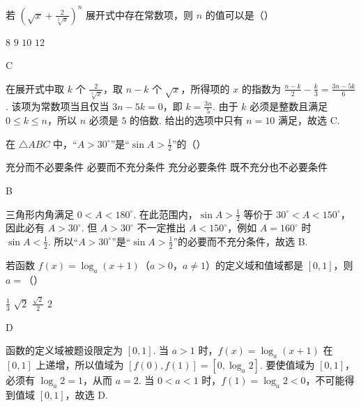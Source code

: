 \begin{problem}
若 \(\left(\sqrt{x} + \frac{2}{\sqrt[3]{x}}\right)^{n}\) 展开式中存在常数项，则 \(n\) 的值可以是（\quad）

\choices
    {\(8\)}
    {\(9\)}
    {\(10\)}
    {\(12\)}
\end{problem}

\begin{answer}
C
\end{answer}

\begin{solution}
在展开式中取 \(k\) 个 \(\frac{2}{\sqrt[3]{x}}\)，取 \(n-k\) 个 \(\sqrt{x}\)，所得项的 \(x\) 的指数为
\(\frac{n-k}{2}-\frac{k}{3}=\frac{3n-5k}{6}\). 该项为常数项当且仅当 \(3n-5k=0\)，即 \(k=\frac{3n}{5}\). 由于 \(k\) 必须是整数且满足 \(0\leqslant k\leqslant n\)，所以 \(n\) 必须是 \(5\) 的倍数. 给出的选项中只有 \(n=10\) 满足，故选 C.
\end{solution}

\begin{problem}
在 \(\triangle ABC\) 中，“\(A > 30^{\circ}\)”是“\(\sin A > \frac{1}{2}\)”的（\quad）

\choices
    {充分而不必要条件}
    {必要而不充分条件}
    {充分必要条件}
    {既不充分也不必要条件}
\end{problem}

\begin{answer}
B
\end{answer}

\begin{solution}
三角形内角满足 \(0<A<180^{\circ}\). 在此范围内，\(\sin A>\frac{1}{2}\) 等价于 \(30^{\circ}<A<150^{\circ}\)，因此必有 \(A>30^{\circ}\). 但 \(A>30^{\circ}\) 不一定推出 \(A<150^{\circ}\)，例如 \(A=160^{\circ}\) 时 \(\sin A<\frac{1}{2}\). 所以“\(A>30^{\circ}\)”是“\(\sin A>\frac{1}{2}\)”的必要而不充分条件，故选 B.
\end{solution}

\begin{problem}
若函数 \(f(x) = \log_{a}(x + 1)\)（\(a > 0\)，\(a \neq 1\)）的定义域和值域都是 \([0, 1]\)，则 \(a =\)（\quad）

\choices
    {\(\frac{1}{3}\)}
    {\(\sqrt{2}\)}
    {\(\frac{\sqrt{2}}{2}\)}
    {\(2\)}
\end{problem}

\begin{answer}
D
\end{answer}

\begin{solution}
函数的定义域被题设限定为 \([0,1]\). 当 \(a>1\) 时，\(f(x)=\log_a(x+1)\) 在 \([0,1]\) 上递增，所以值域为 \([f(0),f(1)]=[0,\log_a2]\). 要使值域为 \([0,1]\)，必须有 \(\log_a2=1\)，从而 \(a=2\). 当 \(0<a<1\) 时，\(f(1)=\log_a2<0\)，不可能得到值域 \([0,1]\)，故选 D.
\end{solution}

